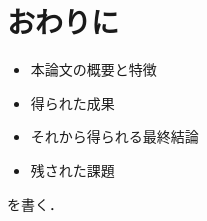 \chapter{おわりに}
\begin{itemize}
\item 本論文の概要と特徴
\item 得られた成果
\item それから得られる最終結論
\item 残された課題
\end{itemize}
を書く．


